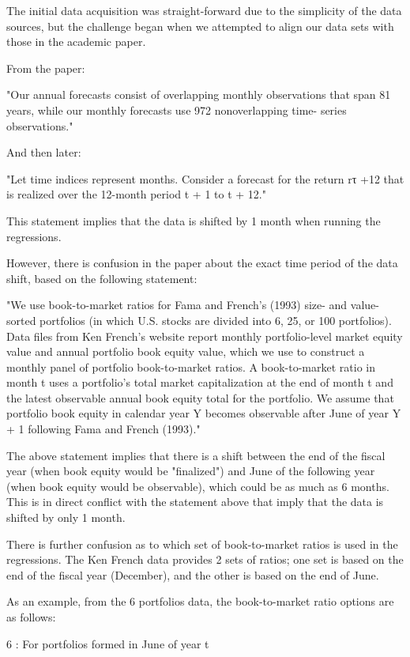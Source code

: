 \documentclass[12pt]{article}
\begin{document}
The initial data acquisition was straight-forward due to the simplicity of the data sources, but the
challenge began when we attempted to align our data sets with those in the academic paper.

From the paper:

"Our annual forecasts consist of overlapping monthly observations
that span 81 years, while our monthly forecasts use 972 nonoverlapping time-
series observations."

And then later:

"Let time indices represent months. Consider a forecast for the return rτ +12
that is realized over the 12-month period t + 1 to t + 12."

This statement implies that the data is shifted by 1 month when running the regressions.

However, there is confusion in the paper about the exact time period of the data shift, based on the
following statement:

"We use book-to-market ratios for Fama and French’s (1993) size- and value-
sorted portfolios (in which U.S. stocks are divided into 6, 25, or 100 portfolios).
Data files from Ken French’s website report monthly portfolio-level market
equity value and annual portfolio book equity value, which we use to construct
a monthly panel of portfolio book-to-market ratios. A book-to-market ratio in
month t uses a portfolio’s total market capitalization at the end of month t and
the latest observable annual book equity total for the portfolio. We assume that
portfolio book equity in calendar year Y becomes observable after June of year
Y + 1 following Fama and French (1993)."

The above statement implies that there is a shift between the end of the fiscal year (when book equity
would be "finalized") and June of the following year (when book equity would be observable), which could 
be as much as 6 months. This is in direct conflict with the statement above that imply that the data is 
shifted by only 1 month.

There is further confusion as to which set of book-to-market ratios is used in the regressions. The Ken French data 
provides 2 sets of ratios; one set is based on the end of the fiscal year (December), and the other is based on the end of June.

As an example, from the 6 portfolios data, the book-to-market ratio options are as follows:


6 : For portfolios formed in June of year t   
\end{document}

